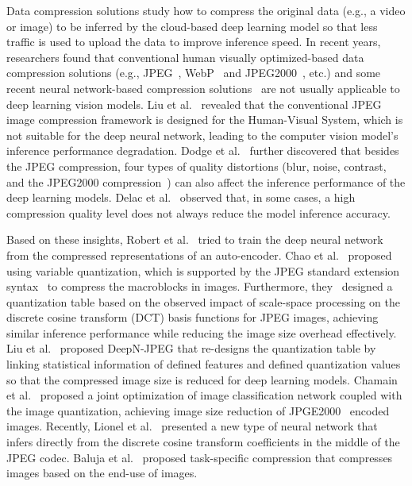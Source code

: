 Data compression solutions study how to compress the original data (e.g., a video or image) to be inferred by the cloud-based deep learning model so that less traffic is used to upload the data to improve inference speed. In recent years, researchers found that conventional human visually optimized-based data compression solutions (e.g., JPEG~\cite{jpeg}, WebP~\cite{calore2010meet} and JPEG2000~\cite{rabbani2002jpeg2000}, etc.) and some recent neural network-based compression solutions~\cite{toderici2017full, theis2017lossy, toderici2015variable, rippel2017real} are not usually applicable to deep learning vision models. Liu et al.~\cite{DeepN-JPEG} revealed that the conventional JPEG image compression framework is designed for the Human-Visual System, which is not suitable for the deep neural network, leading to the computer vision model's inference performance degradation. Dodge et al.~\cite{dodge2016understanding} further discovered that besides the JPEG compression, four types of quality distortions (blur, noise, contrast, and the JPEG2000 compression~\cite{rabbani2002jpeg2000}) can also affect the inference performance of the deep learning models. Delac et al.~\cite{delac2005effects} observed that, in some cases, a high compression quality level does not always reduce the model inference accuracy. %

Based on these insights, Robert et al.~\cite{torfason2018towards} tried to train the deep neural network from the compressed representations of an auto-encoder. Chao et al.~\cite{chao2011preserving} proposed using variable quantization, which is supported by the JPEG standard extension syntax~\cite{dis199110918} to compress the macroblocks in images. Furthermore, they~\cite{chao2013design} designed a quantization table based on the observed impact of scale-space processing on the discrete cosine transform (DCT) basis functions for JPEG images, achieving similar inference performance while reducing the image size overhead effectively. Liu et al.~\cite{DeepN-JPEG} proposed DeepN-JPEG that re-designs the quantization table by linking statistical information of defined features and defined quantization values so that the compressed image size is reduced for deep learning models. Chamain et al.~\cite{2019quannet} proposed a joint optimization of image classification network coupled with the image quantization, achieving image size reduction of JPGE2000~\cite{rabbani2002jpeg2000} encoded images. Recently, Lionel et al.~\cite{gueguen2018faster} presented a new type of neural network that infers directly from the discrete cosine transform coefficients in the middle of the JPEG codec. Baluja et al.~\cite{baluja2019task} proposed task-specific compression that compresses images based on the end-use of images. %

